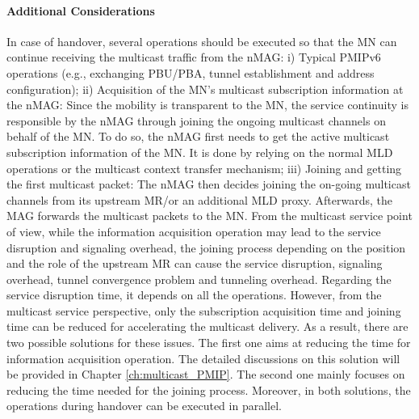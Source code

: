 \paragraph{Additional Considerations \\}
In case of handover, several operations should be executed so that the MN can continue receiving the multicast traffic from the nMAG: i) Typical PMIPv6 operations (e.g., exchanging PBU/PBA, tunnel establishment and address configuration); ii) Acquisition of the MN's multicast subscription information at the nMAG: Since the mobility is transparent to the MN, the service continuity is responsible by the nMAG through joining the ongoing multicast channels on behalf of the MN. To do so, the nMAG first needs to get the active multicast subscription information of the MN. It is done by relying on the normal MLD operations or the multicast context transfer mechanism; iii) Joining and getting the first multicast packet: The nMAG then decides joining the on-going multicast channels from its upstream MR/or an additional MLD proxy. Afterwards, the MAG forwards the multicast packets to the MN. 
From the multicast service point of view, while the information acquisition operation may lead to the service disruption and signaling overhead, the joining process depending on the position and the role of the upstream MR can cause the service disruption, signaling overhead, tunnel convergence problem and tunneling overhead. Regarding the service disruption time, it depends on all the operations. However, from the multicast service perspective, only the subscription acquisition time and joining time can be reduced for accelerating the multicast delivery. As a result, there are two possible solutions for these issues. The first one \cite{SIAL, FPMIPv6_multicast, tuning_MLD, Thinh_WCNC_Multicast} aims at reducing the time for information acquisition operation. The detailed discussions on this solution will be provided in Chapter \ref{ch:multicast_PMIP}. The second one mainly focuses on reducing the time needed for the joining process. Moreover, in both solutions, the operations during handover can be executed in parallel.   

